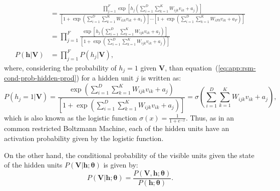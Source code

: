 \begin{align}
    &= \frac{\prod\limits^{F}_{j=1} \exp{\left[h_{j} \left(\sum\limits^{D}_{i=1} \sum\limits^{K}_{k=1} W_{ijk} v_{ik} + a_{j}\right)\right]}}{\left[ 1 + \exp{\left( \sum\limits^{D}_{i=1} \sum\limits^{K}_{k=1} W_{i1k} v_{ik} + a_{1}\right)}\right] \cdots \left[ 1 + \exp{\left( \sum\limits^{D}_{i=1} \sum\limits^{K}_{k=1} W_{iFk} v_{ik} + a_{F}\right)}\right]}  \nonumber \\ %
    &= \prod\limits^{F}_{j=1} \frac{\exp{\left[h_{j} \left(\sum\limits^{D}_{i=1} \sum\limits^{K}_{k=1} W_{ijk} v_{ik} + a_{j}\right)\right]}}{\left[ 1 + \exp{\left( \sum\limits^{D}_{i=1} \sum\limits^{K}_{k=1} W_{ijk} v_{ik} + a_{j}\right)}\right]}  \nonumber \\ %
    \label{eq:app:rsm-cond-prob-hidden-prod}
    P(\mathbf{h} | \mathbf{V}) &= \prod\limits^{F}_{j=1} P(h_{j} | \mathbf{V}),
\end{align}
where, considering the probability of $h_{j} = 1$ given $\mathbf{V}$, than equation~(\ref{eq:app:rsm-cond-prob-hidden-prod}) for a hidden unit $j$ is written as:
\begin{equation}
    \label{eq:app:rsm-hidden-logistic}
    P(h_{j} = 1 | \mathbf{V}) = \frac{\exp{\left(\sum\limits^{D}_{i=1} \sum\limits^{K}_{k=1} W_{ijk} v_{ik} + a_{j} \right)}}{\left[ 1 + \exp{\left(\sum\limits^{D}_{i=1} \sum\limits^{K}_{k=1} W_{ijk} v_{ik} + a_{j} \right)}\right]} = \sigma{\left(\sum\limits^{D}_{i=1} \sum\limits^{K}_{k=1} W_{ijk} v_{ik} + a_{j} \right)}, 
\end{equation}
which is also known as the logistic function $\sigma(x) = \frac{1}{1 + e^{-x}}$.
Thus, as in an common restricted Boltzmann Machine, each of the hidden units have an activation probability given by the logistic function.

On the other hand, the conditional probability of the visible units given the state of the hidden units $P(\mathbf{V} | \mathbf{h}; \bm{\theta})$ is given by:
\begin{equation}
    \label{eq:app:rsm-cond-prob-visible}
    P(\mathbf{V} | \mathbf{h}; \bm{\theta}) = \frac{P(\mathbf{V}, \mathbf{h}; \bm{\theta})}{P(\mathbf{h}; \bm{\theta})}.
\end{equation}

